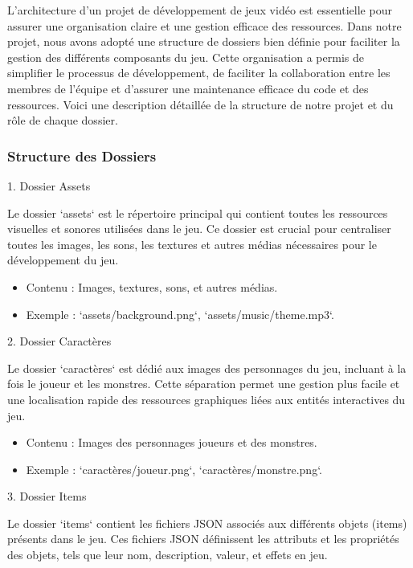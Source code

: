 L'architecture d'un projet de développement de jeux vidéo est essentielle pour assurer une organisation claire et une gestion efficace des ressources.
Dans notre projet, nous avons adopté une structure de dossiers bien définie pour faciliter la gestion des différents composants du jeu. Cette organisation
a permis de simplifier le processus de développement, de faciliter la collaboration entre les membres de l'équipe et d'assurer une maintenance efficace du code
et des ressources. Voici une description détaillée de la structure de notre projet et du rôle de chaque dossier.

\subsubsection{Structure des Dossiers}

1. Dossier Assets

Le dossier `assets` est le répertoire principal qui contient toutes les ressources visuelles et sonores utilisées dans le jeu.
Ce dossier est crucial pour centraliser toutes les images, les sons, les textures et autres médias nécessaires pour le développement du jeu.

\begin{itemize}
      \item Contenu : Images, textures, sons, et autres médias.
      \item Exemple : `assets/background.png`, `assets/music/theme.mp3`.
            \\
\end{itemize}

2. Dossier Caractères

Le dossier `caractères` est dédié aux images des personnages du jeu, incluant à la fois le joueur et les monstres.
Cette séparation permet une gestion plus facile et une localisation rapide des ressources graphiques liées aux entités interactives du jeu.

\begin{itemize}
      \item Contenu : Images des personnages joueurs et des monstres.
      \item Exemple : `caractères/joueur.png`, `caractères/monstre.png`.
            \\
\end{itemize}

3. Dossier Items

Le dossier `items` contient les fichiers JSON associés aux différents objets (items) présents dans le jeu.
Ces fichiers JSON définissent les attributs et les propriétés des objets, tels que leur nom, description, valeur, et effets en jeu.

